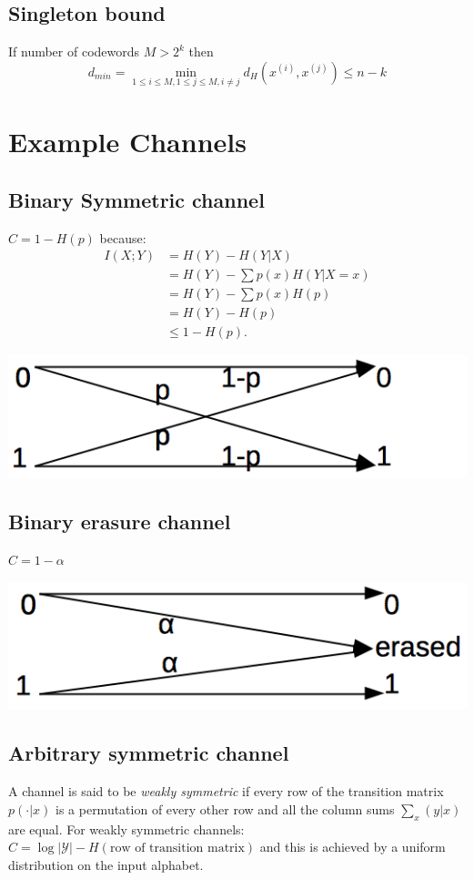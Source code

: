 \documentclass[10pt,a4paper,landscape]{article}
\begin{document}
\begin{multicols*}{4}
\subsection{Singleton bound}
If number of codewords $M > 2^k$ then $$d_{min} = \min_{1\leq i \leq M, 1 \leq j \leq M, i \neq j} d_H(x^{(i)}, x^{(j)}) \leq n-k$$

\section{Example Channels}
\subsection{Binary Symmetric channel}
$C = 1 - H(p)$ because:
\begin{align*}
	I(X; Y) &= H(Y) - H(Y | X)\\
			&= H(Y) - \sum p(x) H(Y| X = x)\\
			&= H(Y) - \sum p(x) H(p)\\
			&= H(Y) - H(p)\\
			&\leq 1 - H(p).
\end{align*}
\begin{colfig}
	\centering
	\includegraphics[width=0.6\linewidth]{binary-symmetric-channel.png}
\end{colfig}

\subsection{Binary erasure channel}
$C = 1 - \alpha$
\begin{colfig}
	\centering
	\includegraphics[width=0.6\linewidth]{binary-erasure-channel.png}
\end{colfig}

\subsection{Arbitrary symmetric channel}
A channel is said to be \emph{weakly symmetric} if every row of the transition matrix $p(\cdot | x)$ is a permutation of every other row and all the column sums $\sum_x (y|x)$ are equal. For weakly symmetric channels:
$C = \log | \mathcal{Y} | - H(\text{row of transition matrix})$
and this is achieved by a uniform distribution on the input alphabet.


\end{multicols*}
\end{document}

